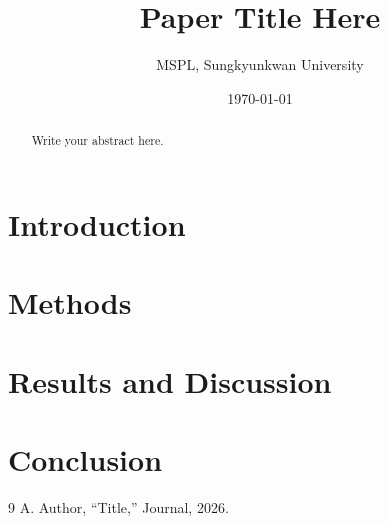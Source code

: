 \documentclass[11pt,a4paper]{article}
\title{Paper Title Here}
\author{MSPL, Sungkyunkwan University}
\date{\today}
\begin{document}
\maketitle

\begin{abstract}
Write your abstract here.
\end{abstract}

\section{Introduction}

\section{Methods}

\section{Results and Discussion}

\section{Conclusion}

\begin{thebibliography}{9}
 A. Author, ``Title,'' Journal, 2026.
\end{thebibliography}
\end{document}
